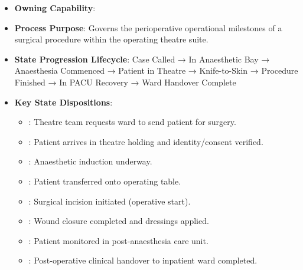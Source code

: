 \begin{itemize}

\item
\textbf{Owning Capability}: \texttt{}



\item
\textbf{Process Purpose}: Governs the perioperative operational milestones of a surgical procedure within the operating theatre suite.



\item
\textbf{State Progression Lifecycle}: Case Called → In Anaesthetic Bay → Anaesthesia Commenced → Patient in Theatre → Knife-to-Skin → Procedure Finished → In PACU Recovery → Ward Handover Complete



\item
\textbf{Key State Dispositions}:


\begin{itemize}

\item
\texttt{}: Theatre team requests ward to send patient for surgery.



\item
\texttt{}: Patient arrives in theatre holding and identity/\allowbreak{}consent verified.



\item
\texttt{}: Anaesthetic induction underway.



\item
\texttt{}: Patient transferred onto operating table.



\item
\texttt{}: Surgical incision initiated (operative start).



\item
\texttt{}: Wound closure completed and dressings applied.



\item
\texttt{}: Patient monitored in post-anaesthesia care unit.



\item
\texttt{}: Post-operative clinical handover to inpatient ward completed.



\end{itemize}


\end{itemize}
\label{rad:processes:185}

